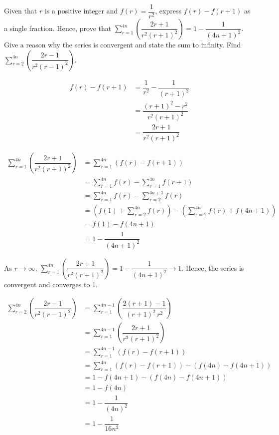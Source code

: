 \documentclass{echw}
\begin{document}
    \problem{}
        Given that $r$ is a positive integer and $f(r) = \dfrac1{r^2}$, express $f(r) - f(r+1)$ as a single fraction. Hence, prove that $\displaystyle\sum\limits_{r=1}^{4n} \left(\dfrac{2r+1}{r^2(r+1)^2}\right) = 1 - \dfrac1{(4n+1)^2}$. Give a reason why the series is convergent and state the sum to infinity. Find $\displaystyle\sum\limits_{r=2}^{4n} \left(\dfrac{2r-1}{r^2(r-1)^2}\right)$.

    \solution
        \begin{align*}
            f(r) - f(r+1) &= \dfrac1{r^2} - \dfrac1{(r+1)^2}\\
            &= \dfrac{(r+1)^2 - r^2}{r^2(r+1)^2}\\
            &= \dfrac{2r+1}{r^2(r+1)^2}
        \end{align*}


        \begin{align*}
            \sum\limits_{r=1}^{4n} \left(\dfrac{2r+1}{r^2(r+1)^2}\right) &= \sum\limits_{r=1}^{4n} (f(r) - f(r+1))\\
            &= \sum\limits_{r=1}^{4n} f(r) - \sum\limits_{r=1}^{4n} f(r+1)\\
            &= \sum\limits_{r=1}^{4n} f(r) - \sum\limits_{r=2}^{4n+1} f(r)\\
            &= \left(f(1) + \sum\limits_{r=2}^{4n} f(r)\right) - \left(\sum\limits_{r=2}^{4n} f(r) + f(4n+1)\right)\\
            &= f(1) - f(4n+1)\\
            &= 1 - \dfrac{1}{(4n+1)^2}
        \end{align*}

        As $r \to \infty$, $\displaystyle\sum\limits_{r=1}^{4n} \left(\dfrac{2r+1}{r^2(r+1)^2}\right) = 1 - \dfrac{1}{(4n+1)^2} \to 1$. Hence, the series is convergent and converges to 1.


        \begin{align*}
            \sum\limits_{r=2}^{4n} \left(\dfrac{2r-1}{r^2(r-1)^2}\right) &= \sum\limits_{r=1}^{4n-1} \left(\dfrac{2(r+1)-1}{(r+1)^2 \, r^2}\right)\\
            &= \sum\limits_{r=1}^{4n-1} \left(\dfrac{2r+1}{r^2(r+1)^2}\right)\\
            &= \sum\limits_{r=1}^{4n-1} (f(r) - f(r+1))\\
            &= \sum\limits_{r=1}^{4n} (f(r) - f(r+1)) - (f(4n) - f(4n+1))\\
            &= 1 - f(4n+1) - (f(4n) - f(4n+1))\\
            &= 1 - f(4n)\\
            &= 1 - \dfrac1{(4n)^2}\\
            &= 1 - \dfrac1{16n^2}
        \end{align*}
\end{document}
